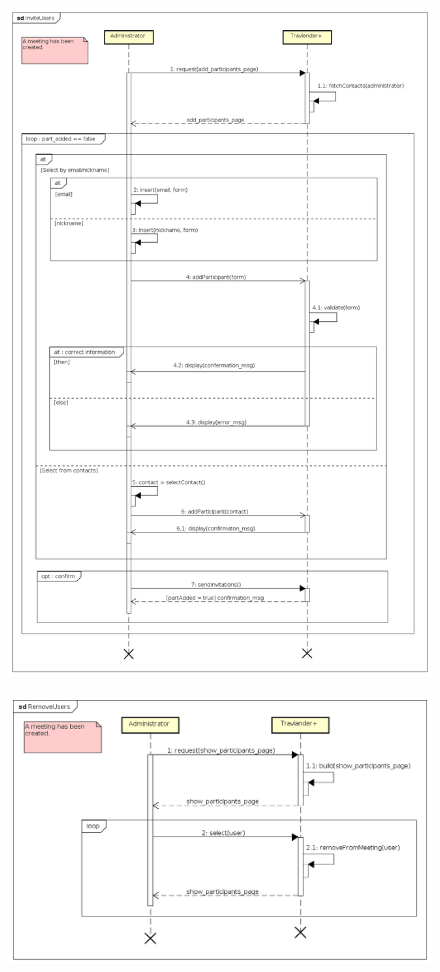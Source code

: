 \begin{figure}[H]
\centering\includegraphics[height=\textheight]{Images/SequenceDiagrams/Admin/InviteUsers.png}{}
\caption{}
\end{figure}

\begin{figure}[H]
\centering\includegraphics[width=\textwidth]{Images/SequenceDiagrams/Admin/RemoveUsers.png}{}
\caption{}
\end{figure}

